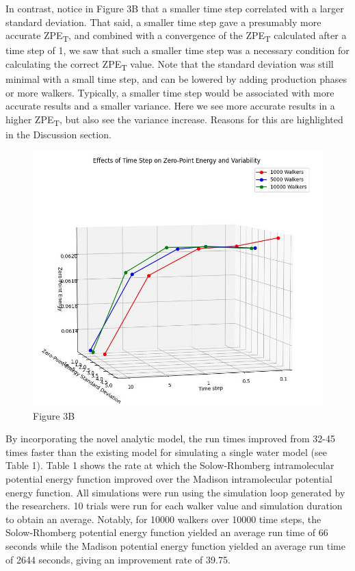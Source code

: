 \documentclass[journal=jacsat,manuscript=article]{achemso}
\begin{document}
In contrast, notice in Figure 3B that a smaller time step correlated with a larger standard deviation. That said, a smaller time step gave a presumably more accurate ZPE\textsubscript{T}, and combined with a convergence of the ZPE\textsubscript{T} calculated after a time step of 1, we saw that such a smaller time step was a necessary condition for calculating the correct ZPE\textsubscript{T} value. Note that the standard deviation was still minimal with a small time step, and can be lowered by adding production phases or more walkers. Typically, a smaller time step would be associated with more accurate results and a smaller variance. Here we see more accurate results in a higher ZPE\textsubscript{T}, but also see the variance increase. Reasons for this are highlighted in the Discussion section.

\begin{figure}
  \includegraphics[width=\linewidth]{fig_3B.jpg}
  \caption{Figure 3B}
  \label{fig:}
\end{figure}

By incorporating the novel analytic model, the run times improved from 32-45 times faster than the existing model for simulating a single water model (see Table 1). Table 1 shows the rate at which the Solow-Rhomberg intramolecular potential energy function improved over the Madison intramolecular potential energy function. All simulations were run using the simulation loop generated by the researchers. 10 trials were run for each walker value and simulation duration to obtain an average. Notably, for 10000 walkers over 10000 time steps, the Solow-Rhomberg potential energy function yielded an average run time of 66 seconds while the Madison potential energy function yielded an average run time of 2644 seconds, giving an improvement rate of 39.75.
\end{document}
